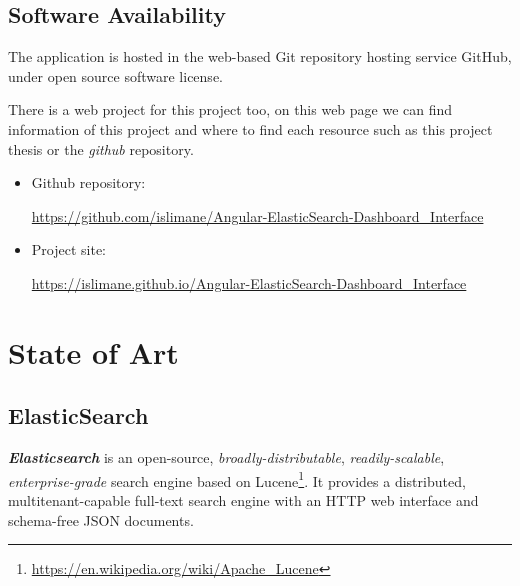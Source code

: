 \documentclass[a4paper, 12pt, english]{book}
\begin{document}

\section{Software Availability}
\label{sec:software-availability}
The application is hosted in the web-based Git repository hosting service GitHub, under open source software license.

There is a web project for this project too, on this web page we can find information of this project and where to find each resource such as this project thesis or the \textit{github} repository.
\begin{itemize}
    \item Github repository:

    \url{https://github.com/islimane/Angular-ElasticSearch-Dashboard_Interface}

    \item Project site:

    \url{https://islimane.github.io/Angular-ElasticSearch-Dashboard_Interface}
\end{itemize}




\cleardoublepage %
\chapter{State of Art} %
\label{chap:state-of-art} %

\section{ElasticSearch} %
\label{sec:elasticsearch} %

\textit{\textbf{Elasticsearch}} is an open-source, \textit{broadly-distributable}, \textit{readily-scalable}, \textit{enterprise-grade} search engine based on Lucene\footnote{\url{https://en.wikipedia.org/wiki/Apache\_Lucene}}. It provides a distributed, multitenant-capable full-text search engine with an HTTP web interface and schema-free JSON documents.
\end{document}
